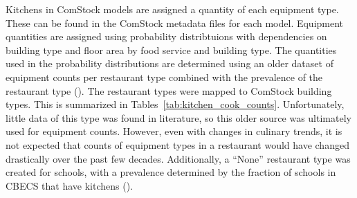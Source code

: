 

Kitchens in ComStock models are assigned a quantity of each equipment type. These can be found in the ComStock metadata files for each model. Equipment quantities are assigned using probability distribtuions with dependencies on building type and floor area by food service and building type. The quantities used in the probability distributions are determined using an older dataset of equipment counts per restaurant type combined with the prevalence of the restaurant type (\cite{com_food_service_equip}). The restaurant types were mapped to ComStock building types. This is summarized in Tables~\ref{tab:kitchen_cook_counts}. Unfortunately, little data of this type was found in literature, so this older source was ultimately used for equipment counts. However, even with changes in culinary trends, it is not expected that counts of equipment types in a restaurant would have changed drastically over the past few decades. Additionally, a “None” restaurant type was created for schools, with a prevalence determined by the fraction of schools in CBECS that have kitchens (\cite{eia2012cbecs}).

